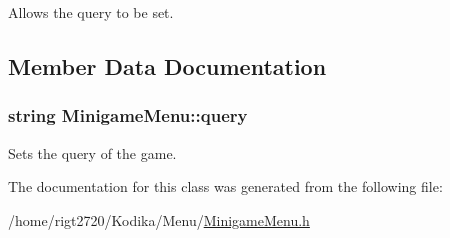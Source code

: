 Allows the query to be set. 



\subsection{Member Data Documentation}
\hypertarget{classMinigameMenu_a5c36c7797c89ff8d0e6646800b0de38a}{
\subsubsection[{query}]{\setlength{\rightskip}{0pt plus 5cm}string Minigame\-Menu\-::query\hspace{0.3cm}{\ttfamily [protected]}}}\label{classMinigameMenu_a5c36c7797c89ff8d0e6646800b0de38a}


Sets the query of the game. 



The documentation for this class was generated from the following file\-:\begin{DoxyCompactItemize}
\item 
/home/rigt2720/\-Kodika/\-Menu/\hyperlink{MinigameMenu_8h}{Minigame\-Menu.\-h}\end{DoxyCompactItemize}
